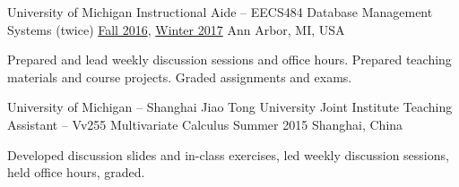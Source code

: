 \begin{cventries}

\cventry
  {University of Michigan} %
  {Instructional Aide – EECS484 Database Management Systems (twice)} %
  {\href{http://web.eecs.umich.edu/~aprakash/eecs484/index.html}{Fall 2016}, \href{http://web.eecs.umich.edu/~mozafari/eecs484/}{Winter 2017}} %
  {Ann Arbor, MI, USA} %
  {
    \begin{cvitems} %
      \item {Prepared and lead weekly discussion sessions and office hours. Prepared teaching materials and course projects. Graded assignments and exams.}
    \end{cvitems}
  }

\cventry
  {University of Michigan – Shanghai Jiao Tong University Joint Institute} %
  {Teaching Assistant – Vv255 Multivariate Calculus} %
  {Summer 2015} %
  {Shanghai, China} %
  {
    \begin{cvitems} %
      \item {Developed discussion slides and in-class exercises, led weekly discussion sessions, held office hours, graded.}
    \end{cvitems}
  }

\end{cventries}